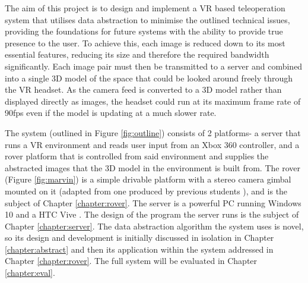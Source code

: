The aim of this project is to design and implement a VR based teleoperation system that utilises data abstraction to minimise the outlined technical issues, providing the foundations for future systems with the ability to provide true presence to the user. To achieve this, each image is reduced down to its most essential features, reducing its size and therefore the required bandwidth significantly. Each image pair must then be transmitted to a server and combined into a single 3D model of the space that could be looked around freely through the VR headset. As the camera feed is converted to a 3D model rather than displayed directly as images, the headset could run at its maximum frame rate of 90fps even if the model is updating at a much slower rate.

The system (outlined in Figure \ref{fig:outline}) consists of 2 platforms- a server that runs a VR environment and reads user input from an Xbox 360 controller, and a rover platform that is controlled from said environment and supplies the abstracted images that the 3D model in the environment is built from. The rover (Figure \ref{fig:marvin}) is a simple drivable platform with a stereo camera gimbal mounted on it (adapted from one produced by previous students \cite{gimble}), and is the subject of Chapter \ref{chapter:rover}. The server is a powerful PC running Windows 10 \cite{windows} and a HTC Vive \cite{Vive}. The design of the program the server runs is the subject of Chapter \ref{chapter:server}. The data abstraction algorithm the system uses is novel, so its design and development is initially discussed in isolation in Chapter \ref{chapter:abstract} and then its application within the system addressed in Chapter \ref{chapter:rover}. The full system will be evaluated in Chapter \ref{chapter:eval}.

